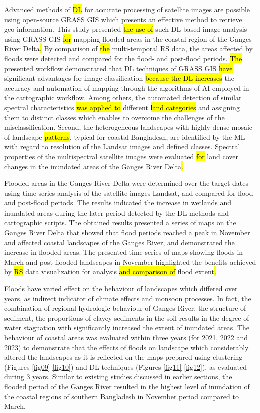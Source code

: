 \documentclass[water,article,submit,pdftex,moreauthors]{Definitions/mdpi}
\begin{document}
Advanced methods of \hl{DL} for accurate processing of satellite images are possible using open-source GRASS GIS which presents an effective method to retrieve geo-information. This study presented \hl{the use of }such DL-based image analysis using\hl{ }GRASS GIS \hl{for} mapping flooded areas in the coastal region of the Ganges River Delta\hl{. }By comparison of \hl{the} multi-temporal RS data, the areas affected by floods were detected and compared for the flood- and post-flood periods. \hl{The} presented workflow demonstrated that DL techniques of GRASS GIS \hl{have} significant advantages for image classification \hl{because the DL increases} the accuracy and automation of mapping through the algorithms of AI employed in the cartographic workflow. Among others,\hl{ }the automated detection of similar spectral characteristics \hl{was applied to} different \hl{land categories} and assigning them to distinct classes which enables to overcome the challenges of the misclassification. Second, the heterogeneous landscapes with highly dense mosaic of landscape \hl{patterns}, typical for coastal Bangladesh, are identified by the ML\hl{ }with regard to\hl{ }resolution of the Landsat images and defined classes. Spectral properties of the multispectral satellite images\hl{ }were evaluated \hl{for} land cover changes\hl{ }in the inundated areas of the Ganges River Delta\hl{.} 

Flooded areas in the Ganges River Delta were determined over the target dates using time series analysis of the satellite images Landsat, and compared for flood- and post-flood periods. The results indicated the increase in wetlands and inundated areas during the later period detected by the DL methods\hl{ }and cartographic scripts. The obtained results presented a series of maps on the Ganges River Delta that showed that flood periods reached a peak in November and affected coastal landscapes of the Ganges River, and demonstrated the increase in flooded areas. The presented time series of maps showing floods in March and post-flooded landscapes in November highlighted the benefits achieved by \hl{RS} data visualization for analysis \hl{and comparison of} flood extent\hl{.} 

Floods have varied effect on the behaviour of landscapes which differed over years, as indirect indicator of climate effects and monsoon processes. In fact, the combination of regional hydrologic behaviour of Ganges River, the structure of sediment, the proportions of clayey sediments in the soil results in the degree of water stagnation with significantly increased the extent of inundated areas. The behaviour of coastal areas was evaluated within three years (for 2021, 2022 and 2023) to demonstrate that the effects of floods on landscape which considerably altered the landscapes as it is reflected on the maps prepared using clustering (Figures \ref{fig09}-\ref{fig10}) and DL techniques (Figures \ref{fig11}-\ref{fig12}), as evaluated during 3 years. Similar to existing studies discussed in earlier sections, the flooded period of the Ganges River resulted in the highest level of inundation of the coastal regions of southern Bangladesh in November period compared to March. 
\end{document}
